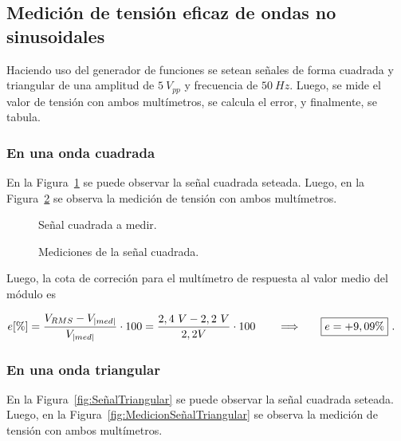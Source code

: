   \subsection{Medición de tensión eficaz de ondas no sinusoidales}
    Haciendo uso del generador de funciones se setean señales de forma cuadrada y
    triangular de una amplitud de $5~V_{pp}$ y frecuencia de $50~Hz$. Luego, se 
    mide el valor de tensión con ambos multímetros, se calcula el error, y finalmente,
    se tabula.

    \subsubsection{En una onda cuadrada}
      En la Figura~\ref{fig:SeñalCuadrada} se puede observar la señal cuadrada seteada.
      Luego, en la Figura~\ref{fig:MedicionSeñalCuadrada} se observa la medición de tensión
      con ambos multímetros.

      \begin{figure}[H]
        \centering
        \caption{Señal cuadrada a medir.}
        \label{fig:SeñalCuadrada}
      \end{figure}

      \begin{figure}[H]
        \centering
        \caption{Mediciones de la señal cuadrada.}
        \label{fig:MedicionSeñalCuadrada}
      \end{figure}

      Luego, la cota de correción para el multímetro de respuesta al valor medio del módulo es

      \begin{align*}
        e [\%] = \dfrac{V_{RMS} - V_{|med|}}{V_{|med|}} \cdot 100
               = \dfrac{2,4~V - 2,2~V}{2,2V} \cdot 100
               \hspace{20pt} \Longrightarrow \hspace{20pt} \Aboxed{e = +9,09\%}~.
      \end{align*}


    \subsubsection{En una onda triangular}
      En la Figura~\ref{fig:SeñalTriangular} se puede observar la señal cuadrada seteada.
      Luego, en la Figura~\ref{fig:MedicionSeñalTriangular} se observa la medición de tensión
      con ambos multímetros.


